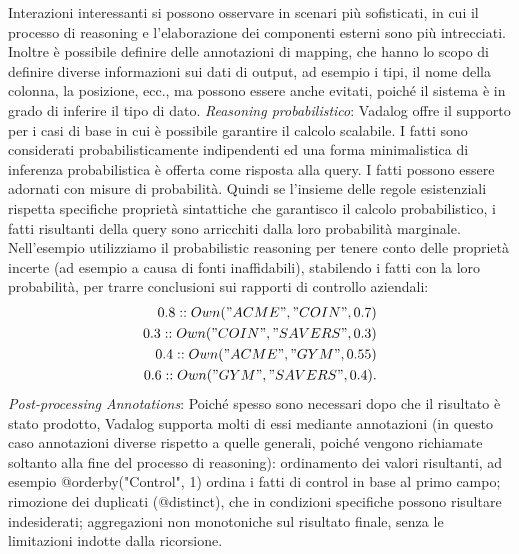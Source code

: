 Interazioni interessanti si possono osservare in scenari più sofisticati, in cui il processo di reasoning e l'elaborazione dei componenti esterni sono più intrecciati. \newline
Inoltre è possibile definire delle annotazioni di mapping, che hanno lo scopo di definire diverse informazioni sui dati di output, ad esempio i tipi, il nome della colonna, la posizione, ecc., ma possono essere anche evitati, poiché il sistema è in grado di inferire il tipo di dato. \newline \newline
\emph{Reasoning probabilistico}: Vadalog offre il supporto per i casi di base in cui è possibile garantire il calcolo scalabile. I fatti sono considerati probabilisticamente indipendenti ed una forma minimalistica di inferenza probabilistica è offerta come risposta alla query. I fatti possono essere adornati con misure di probabilità. \newline
Quindi se l'insieme delle regole esistenziali rispetta specifiche proprietà sintattiche che garantisco il calcolo probabilistico, i fatti risultanti della query sono arricchiti dalla loro probabilità marginale. \newline
Nell'esempio utilizziamo il probabilistic reasoning per tenere conto delle proprietà incerte (ad esempio a causa di fonti inaffidabili), stabilendo i fatti con la loro probabilità, per trarre conclusioni sui rapporti di controllo aziendali:
\begin{align}
	0.8 :: Own("ACME", "COIN", 0.7) \nonumber \\
	0.3 :: Own("COIN", "SAVERS", 0.3) \nonumber \\
	0.4 :: Own("ACME", "GYM", 0.55) \nonumber \\
	0.6 :: Own("GYM", "SAVERS", 0.4). \nonumber 
\end{align}
\emph{Post-processing Annotations}: Poiché spesso sono necessari dopo che il risultato è stato prodotto, Vadalog supporta molti di essi mediante annotazioni (in questo caso annotazioni diverse rispetto a quelle generali, poiché vengono richiamate soltanto alla fine del processo di reasoning): ordinamento dei valori risultanti, ad esempio @orderby("Control", 1) ordina i fatti di control in base al primo campo; rimozione dei duplicati (@distinct), che in condizioni specifiche possono risultare indesiderati; aggregazioni non monotoniche sul risultato finale, senza le limitazioni indotte dalla ricorsione. \newline \newline
